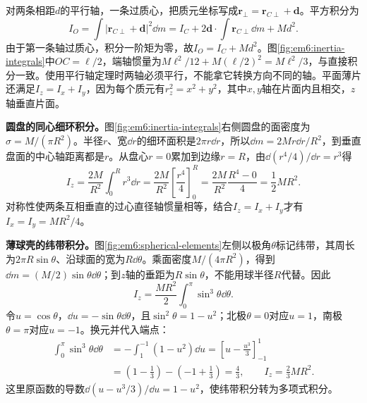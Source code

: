 对两条相距$d$的平行轴，一条过质心，把质元坐标写成$\bm r_\perp=\bm r_{C\perp}+\bm d$。平方积分为
\[I_O=\int|\bm r_{C\perp}+\bm d|^2\dd m=I_C+2\bm d\cdot\int\bm r_{C\perp}\dd m+Md^2.\]
由于第一条轴过质心，积分一阶矩为零，故$I_O=I_C+Md^2$。图\ref{fig:em6:inertia-integrals}中$OC=\ell/2$，端轴惯量为$M\ell^2/12+M(\ell/2)^2=M\ell^2/3$，与直接积分一致。使用平行轴定理时两轴必须平行，不能拿它转换方向不同的轴。平面薄片还满足$I_z=I_x+I_y$，因为每个质元有$r_z^2=x^2+y^2$，其中$x,y$轴在片面内且相交，$z$轴垂直片面。

\textbf{圆盘的同心细环积分。}图\ref{fig:em6:inertia-integrals}右侧圆盘的面密度为$\sigma=M/(\pi R^2)$。半径$r$、宽$\dd r$的细环面积是$2\pi r\dd r$，所以$\dd m=2Mr\dd r/R^2$，到垂直盘面的中心轴距离都是$r$。从盘心$r=0$累加到边缘$r=R$，由$\dd(r^4/4)/\dd r=r^3$得
\[
 I_z=\frac{2M}{R^2}\int_0^R r^3\dd r
 =\frac{2M}{R^2}\left[\frac{r^4}{4}\right]_0^R
 =\frac{2M}{R^2}\frac{R^4-0}{4}=\frac12MR^2.
\]
对称性使两条互相垂直的过心直径轴惯量相等，结合$I_z=I_x+I_y$才有$I_x=I_y=MR^2/4$。


\textbf{薄球壳的纬带积分。}图\ref{fig:em6:spherical-elements}左侧以极角$\theta$标记纬带，其周长为$2\pi R\sin\theta$、沿球面的宽为$R\dd\theta$。乘面密度$M/(4\pi R^2)$，得到$\dd m=(M/2)\sin\theta\dd\theta$；到$z$轴的垂距为$R\sin\theta$，不能用球半径$R$代替。因此
\[
 I_z=\frac{MR^2}{2}\int_0^\pi\sin^3\theta\dd\theta.
\]
令$u=\cos\theta$，$\dd u=-\sin\theta\dd\theta$，且$\sin^2\theta=1-u^2$；北极$\theta=0$对应$u=1$，南极$\theta=\pi$对应$u=-1$。换元并代入端点：
\[
 \begin{aligned}
 \int_0^\pi\sin^3\theta\dd\theta
 &=-\int_1^{-1}(1-u^2)\dd u
 =\left[u-\frac{u^3}{3}\right]_{-1}^{1}\\
 &=\left(1-\frac13\right)-\left(-1+\frac13\right)=\frac43,
 \qquad I_z=\frac23MR^2.
 \end{aligned}
\]
这里原函数的导数$\dd(u-u^3/3)/\dd u=1-u^2$，使纬带积分转为多项式积分。

